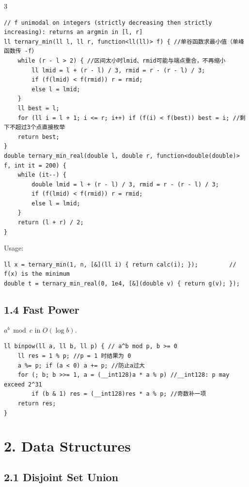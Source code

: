 \documentclass[8pt]{extarticle}
\begin{document}
\begin{multicols*}{3}
\begin{lstlisting}
// f unimodal on integers (strictly decreasing then strictly increasing): returns an argmin in [l, r]
ll ternary_min(ll l, ll r, function<ll(ll)> f) { //单谷函数求最小值（单峰函数传 -f）
    while (r - l > 2) { //区间太小时lmid、rmid可能与端点重合，不再缩小
        ll lmid = l + (r - l) / 3, rmid = r - (r - l) / 3;
        if (f(lmid) < f(rmid)) r = rmid;
        else l = lmid;
    }
    ll best = l;
    for (ll i = l + 1; i <= r; i++) if (f(i) < f(best)) best = i; //剩下不超过3个点直接枚举
    return best;
}
double ternary_min_real(double l, double r, function<double(double)> f, int it = 200) {
    while (it--) {
        double lmid = l + (r - l) / 3, rmid = r - (r - l) / 3;
        if (f(lmid) < f(rmid)) r = rmid;
        else l = lmid;
    }
    return (l + r) / 2;
}
\end{lstlisting}

Usage:

\begin{lstlisting}
ll x = ternary_min(1, n, [&](ll i) { return calc(i); });         // f(x) is the minimum
double t = ternary_min_real(0, 1e4, [&](double v) { return g(v); });
\end{lstlisting}

\subsection*{1.4 Fast Power}

$a^b \bmod c$ in $O(\log b)$.

\begin{lstlisting}
ll binpow(ll a, ll b, ll p) { // a^b mod p, b >= 0
    ll res = 1 % p; //p = 1 时结果为 0
    a %= p; if (a < 0) a += p; //防止a过大
    for (; b; b >>= 1, a = (__int128)a * a % p) //__int128: p may exceed 2^31
        if (b & 1) res = (__int128)res * a % p; //奇数补一项
    return res;
}
\end{lstlisting}

\section*{2. Data Structures}

\subsection*{2.1 Disjoint Set Union}


\end{multicols*}
\end{document}
